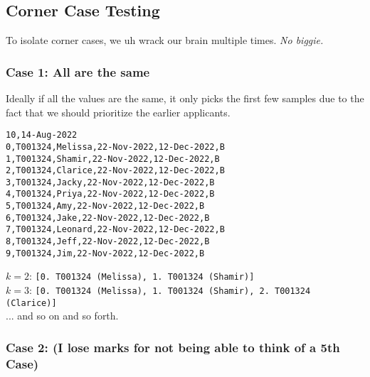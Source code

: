 \documentclass{article}
\begin{document}
\subsection{Corner Case Testing}
To isolate corner cases, we uh wrack our brain multiple times. \textit{No biggie.}

\subsubsection{Case 1: All are the same}

Ideally if all the values are the same, it only picks the first few samples due to the fact that we should prioritize the earlier applicants.
\begin{tcolorbox}
\texttt{10,14-Aug-2022} \\
\texttt{0,T001324,Melissa,22-Nov-2022,12-Dec-2022,B} \\
\texttt{1,T001324,Shamir,22-Nov-2022,12-Dec-2022,B} \\
\texttt{2,T001324,Clarice,22-Nov-2022,12-Dec-2022,B} \\
\texttt{3,T001324,Jacky,22-Nov-2022,12-Dec-2022,B} \\
\texttt{4,T001324,Priya,22-Nov-2022,12-Dec-2022,B} \\
\texttt{5,T001324,Amy,22-Nov-2022,12-Dec-2022,B} \\
\texttt{6,T001324,Jake,22-Nov-2022,12-Dec-2022,B} \\
\texttt{7,T001324,Leonard,22-Nov-2022,12-Dec-2022,B} \\
\texttt{8,T001324,Jeff,22-Nov-2022,12-Dec-2022,B} \\
\texttt{9,T001324,Jim,22-Nov-2022,12-Dec-2022,B}
\end{tcolorbox}
\begin{tcolorbox}
$k = 2$: \texttt{[0. T001324 (Melissa), 1. T001324 (Shamir)]} \\
$k = 3$: \texttt{[0. T001324 (Melissa), 1. T001324 (Shamir), 2. T001324 (Clarice)]} \\
... and so on and so forth.
\end{tcolorbox}

\subsubsection{Case 2: (I lose marks for not being able to think of a 5th Case)}

\newpage
\end{document}
